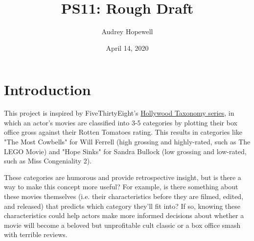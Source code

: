 \documentclass{article}
\title{PS11: Rough Draft}
\author{Audrey Hopewell }
\date{April 14, 2020}
\begin{document}
\maketitle

\section{Introduction}
This project is inspired by FiveThirtyEight's \href{https://fivethirtyeight.com/tag/hollywood-taxonomy/}{Hollywood Taxonomy series}, in which an actor's movies are classified into 3-5 categories by plotting their box office gross against their Rotten Tomatoes rating. This results in categories like "The Most Cowbells" for Will Ferrell (high grossing and highly-rated, such as The LEGO Movie) \cite{ferrell} and "Hope Sinks" for Sandra Bullock (low grossing and low-rated, such as Miss Congeniality 2)\cite{bullock}. 

These categories are humorous and provide retrospective insight, but is there a way to make this concept more useful? For example, is there something about these movies themselves (i.e. their characteristics before they are filmed, edited, and released) that predicts which category they'll fit into? If so, knowing these characteristics could help actors make more informed decisions about whether a movie will become a beloved but unprofitable cult classic or a box office smash with terrible reviews.
\end{document}
